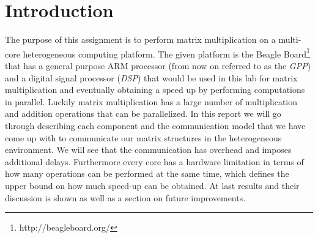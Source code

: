 \newpage
\section{Introduction}

The purpose of this assignment is to perform matrix multiplication on a multi-core heterogeneous computing platform. The given platform is the Beagle Board\footnote{http://beagleboard.org/} that has a general purpose ARM processor (from now on referred to as the \emph{GPP}) and a digital signal processor (\emph{DSP}) that would be used in this lab for matrix multiplication and eventually obtaining a speed up by performing computations in parallel. Luckily matrix multiplication has a large number of multiplication and addition operations that can be parallelized. In this report we will go through describing each component and the communication model that we have come up with to communicate our matrix structures in the heterogeneous environment. We will see that the communication has overhead and imposes additional delays. Furthermore every core has a hardware limitation in terms of how many operations can be performed at the same time, which defines the upper bound on how much speed-up can be obtained. At last results and their discussion is shown as well as a section on future improvements.
